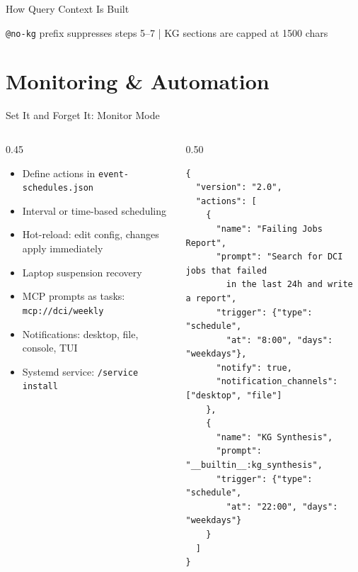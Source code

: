 \documentclass[aspectratio=169,10pt]{beamer}
\begin{document}
\begin{frame}[fragile]{How Query Context Is Built}

\vfill
{\scriptsize\color{gray}
\texttt{@no-kg} prefix suppresses steps 5--7 \quad|\quad
KG sections are capped at 1500 chars}
\end{frame}

\section{Monitoring \& Automation}

\begin{frame}[fragile]{Set It and Forget It: Monitor Mode}
\begin{columns}[T]
\begin{column}{0.45\textwidth}
\begin{itemize}\scriptsize\setlength{\itemsep}{1pt}
  \item Define actions in \texttt{event-schedules.json}
  \item Interval or time-based scheduling
  \item \alert{Hot-reload}: edit config, changes apply immediately
  \item Laptop suspension recovery
  \item MCP prompts as tasks: \texttt{mcp://dci/weekly}
  \item Notifications: desktop, file, console, TUI
  \item \alert{Systemd service}: \texttt{/service install}
\end{itemize}
\end{column}
\begin{column}{0.50\textwidth}
\begin{lstlisting}[style=json,basicstyle=\ttfamily\fontsize{5}{6}\selectfont,title={\scriptsize event-schedules.json}]
{
  "version": "2.0",
  "actions": [
    {
      "name": "Failing Jobs Report",
      "prompt": "Search for DCI jobs that failed
        in the last 24h and write a report",
      "trigger": {"type": "schedule",
        "at": "8:00", "days": "weekdays"},
      "notify": true,
      "notification_channels": ["desktop", "file"]
    },
    {
      "name": "KG Synthesis",
      "prompt": "__builtin__:kg_synthesis",
      "trigger": {"type": "schedule",
        "at": "22:00", "days": "weekdays"}
    }
  ]
}
\end{lstlisting}
\end{column}
\end{columns}
\end{frame}
\end{document}
